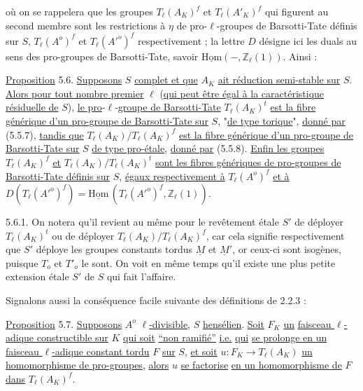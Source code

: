 
où on se rappelera que les groupes $T_\ell(A_K)^f$ et $T_\ell(A'_K)^f$ qui figurent au second membre sont les restrictions à $\eta$ de pro-$\ell$-groupes de Barsotti-Tate définis sur $S$, $T_\ell(A^o)^f$ et $T_\ell({A'}^o)^f$ respectivement ; la lettre $D$ désigne ici les duals au sens des pro-groupes de Barsotti-Tate, savoir $\underline{\mathrm{Hom}}( - , \mathbb{Z}_\ell(1))$. Ainsi :

\underline{Proposition} 5.6. \underline{Supposons} $S$ \underline{complet et que} $A_K$ \underline{ait réduction semi-stable sur} $S$. \underline{Alors pour tout nombre premier} $\ell$ (\underline{qui peut être égal à la caractéristique résiduelle de} $S$), \underline{le pro}-$\ell$-\underline{groupe de Barsotti-Tate} $T_\ell(A_K)^t$ \underline{est la fibre générique d'un pro-groupe de Barsotti-Tate sur} $S$, "\underline{de type torique}", \underline{donné par} (5.5.7), \underline{tandis que} $T_\ell(A_K)/T_\ell(A_K)^f$ \underline{est la fibre générique d'un pro-groupe de Barsotti-Tate sur} $S$ \underline{de type pro-étale}, \underline{donné par} (5.5.8). \underline{Enfin les groupes} $T_\ell(A_K)^f$ \underline{et} $T_\ell(A_K)/T_\ell(A_K)^t$ \underline{sont les fibres génériques de pro-groupes de Barsotti-Tate définis sur} $S$, \underline{égaux respectivement à} $T_\ell(A^o)^f$ \underline{et à} $D(T_\ell({A'}^o)^f) = \underline{\mathrm{Hom}}\,(T_\ell({A'}^o)^f, \mathbb{Z}_\ell(1))$.

5.6.1. On notera qu'il revient au même pour le revêtement étale $S'$ de déployer $T_\ell(A_K)^t$ ou de déployer $T_\ell(A_K)/T_\ell(A_K)^f$, car cela signifie respectivement que $S'$ déploye les groupes constants tordus $\underline{M}$ et $\underline{M}'$, or ceux-ci sont isogènes, puisque $T_o$ et $T'_o$ le sont. On voit en même temps qu'il existe une plus petite extension étale $S'$ de $S$ qui fait l'affaire.

Signalons aussi la conséquence facile suivante des définitions de 2.2.3 :



\underline{Proposition} 5.7.  \underline{Supposons} $A^o$ \underline{$\ell$-divisible}, $S$ \underline{hensélien}. \underline{Soit} $F_K$ \underline{un} \underline{faisceau $\ell$-adique constructible sur} $K$ \underline{qui soit} \underline{``non ramifié''} \underline{i.e.} \underline{qui} \underline{se prolonge en un faisceau $\ell$-adique constant tordu} $F$ \underline{sur} $S$, \underline{et soit} $u: F_K \longrightarrow T_\ell(A_K)$ \underline{un homomorphisme de pro-groupes}, \underline{alors} $u$ \underline{se factorise} \underline{en un homomorphisme de} $F$ \underline{dans} $T_\ell(A_K)^f$.

